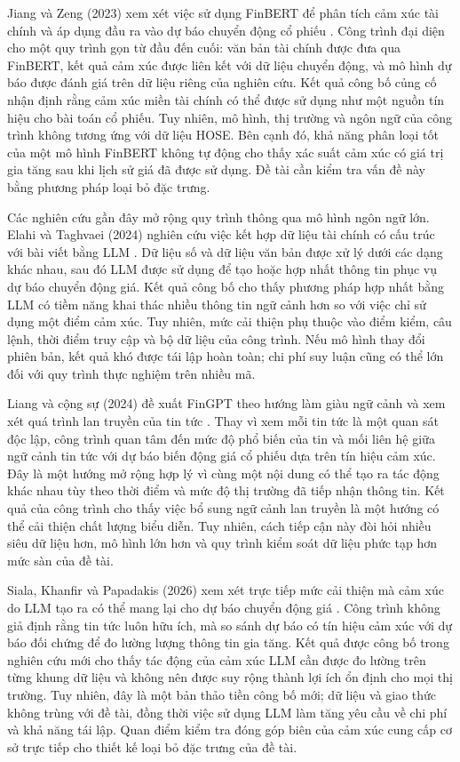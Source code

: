 \documentclass[12pt, a4paper, oneside]{report}
\begin{document}
Jiang và Zeng (2023) xem xét việc sử dụng FinBERT để phân tích cảm xúc tài chính và áp
dụng đầu ra vào dự báo chuyển động cổ phiếu \cite{Jiang2023_230602136v3}. Công trình
đại diện cho một quy trình gọn từ đầu đến cuối: văn bản tài chính được đưa qua FinBERT,
kết quả cảm xúc được liên kết với dữ liệu chuyển động, và mô hình dự báo được đánh giá
trên dữ liệu riêng của nghiên cứu. Kết quả công bố củng cố nhận định rằng cảm xúc miền
tài chính có thể được sử dụng như một nguồn tín hiệu cho bài toán cổ phiếu. Tuy nhiên,
mô hình, thị trường và ngôn ngữ của công trình không tương ứng với dữ liệu HOSE. Bên
cạnh đó, khả năng phân loại tốt của một mô hình FinBERT không tự động cho thấy xác suất cảm xúc có giá trị gia tăng sau khi lịch sử giá đã được sử dụng. Đề tài
cần kiểm tra vấn đề này bằng phương pháp loại bỏ đặc trưng.

Các nghiên cứu gần đây mở rộng quy trình thông qua mô hình ngôn ngữ lớn. Elahi và
Taghvaei (2024) nghiên cứu việc kết hợp dữ liệu tài chính có cấu trúc với bài viết bằng
LLM \cite{Elahi2024_241101368v1}. Dữ liệu số và dữ liệu văn bản được xử lý dưới các
dạng khác nhau, sau đó LLM được sử dụng để tạo hoặc hợp nhất thông tin phục vụ dự báo
chuyển động giá. Kết quả công bố cho thấy phương pháp hợp nhất bằng LLM có tiềm năng
khai thác nhiều thông tin ngữ cảnh hơn so với việc chỉ sử dụng một điểm cảm xúc. Tuy
nhiên, mức cải thiện phụ thuộc vào điểm kiểm, câu lệnh, thời điểm truy cập và bộ dữ liệu
của công trình. Nếu mô hình thay đổi phiên bản, kết quả khó được tái lập hoàn toàn; chi phí suy luận cũng có thể lớn đối với quy trình thực nghiệm trên nhiều mã.

Liang và cộng sự (2024) đề xuất FinGPT theo hướng làm giàu ngữ cảnh và xem xét quá
trình lan truyền của tin tức \cite{Liang2024_241210823v2}. Thay vì xem mỗi tin tức là
một quan sát độc lập, công trình quan tâm đến mức độ phổ biến của tin và mối liên hệ
giữa ngữ cảnh tin tức với dự báo biến động giá cổ phiếu dựa trên tín hiệu cảm xúc. Đây
là một hướng mở rộng hợp lý vì cùng một nội dung có thể tạo ra tác động khác nhau tùy
theo thời điểm và mức độ thị trường đã tiếp nhận thông tin. Kết quả của công trình cho
thấy việc bổ sung ngữ cảnh lan truyền là một hướng có thể cải thiện chất lượng biểu
diễn. Tuy nhiên, cách tiếp cận này đòi hỏi nhiều siêu dữ liệu hơn, mô hình lớn hơn và
quy trình kiểm soát dữ liệu phức tạp hơn mức sàn của đề tài.

Siala, Khanfir và Papadakis (2026) xem xét trực tiếp mức cải thiện mà cảm xúc do LLM
tạo ra có thể mang lại cho dự báo chuyển động giá \cite{Siala2026_260200086v3}. Công
trình không giả định rằng tin tức luôn hữu ích, mà so sánh dự báo có tín hiệu cảm xúc
với dự báo đối chứng để đo lường lượng thông tin gia tăng. Kết quả được công bố trong
nghiên cứu mới cho thấy tác động của cảm xúc LLM cần được đo lường trên từng khung dữ
liệu và không nên được suy rộng thành lợi ích ổn định cho mọi thị trường. Tuy nhiên,
đây là một bản thảo tiền công bố mới; dữ liệu và giao thức không trùng với đề tài, đồng
thời việc sử dụng LLM làm tăng yêu cầu về chi phí và khả năng tái lập. Quan điểm kiểm
tra đóng góp biên của cảm xúc cung cấp cơ sở trực tiếp cho thiết kế loại bỏ đặc trưng
của đề tài.
\end{document}
